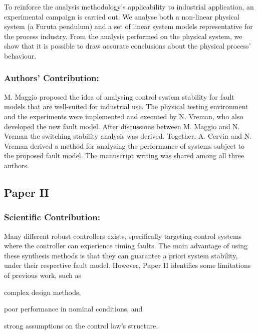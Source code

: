 To reinforce the analysis methodology's applicability to industrial application, an experimental campaign is carried out.
We analyse both a non-linear physical system (a Furuta pendulum) and a set of linear system models representative for the process industry.
From the analysis performed on the physical system, we show that it is possible to draw accurate conclusions about the physical process' behaviour.

\subsubsection*{Authors' Contribution:}%
%
M. Maggio proposed the idea of analysing control system stability for fault models that are well-suited for industrial use.
The physical testing environment and the experiments were implemented and executed by N. Vreman, who also developed the new fault model.
After discussions between M. Maggio and N. Vreman the switching stability analysis was derived.
Together, A. Cervin and N. Vreman derived a method for analysing the performance of systems subject to the proposed fault model.
The manuscript writing was shared among all three authors.



\clearpage %

\subsection*{Paper II}%
%
\begin{quote}
\end{quote}

\subsubsection*{Scientific Contribution:}%
%
Many different robust controllers exists, specifically targeting control systems where the controller can experience timing faults.
The main advantage of using these synthesis methods is that they can guarantee a priori system stability, under their respective fault model.
However, Paper II identifies some limitations of previous work, such as
\begin{enumerate*}[label=(\roman*)]
    \item complex design methods,
    \item poor performance in nominal conditions, and
    \item strong assumptions on the control law's structure.
\end{enumerate*}

